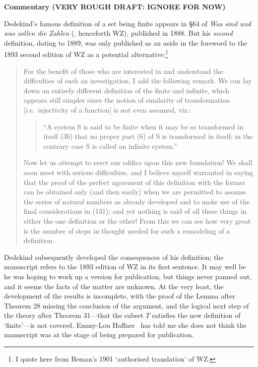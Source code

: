 \documentclass[leqno,hidelinks,10pt]{article}
\theoremstyle{definition}
\begin{document}
\newpage

\restoregeometry

\begin{center}{\Large\textbf{Commentary (VERY ROUGH DRAFT: IGNORE FOR NOW)\ \\ }}
\end{center}


\justifying



Dedekind's famous definition of a set being finite appears in \S 64 of \emph{Was sind und was sollen die Zahlen} (\cite{WZ}, henceforth WZ), published in 1888.
But his \emph{second} definition, dating to 1889, was only published as an aside in the foreword to the 1893 second edition of WZ as a potential alternative:\footnote{I quote here from Beman's 1901 `authorised translation' of WZ.}

\begin{quote}
 For the benefit of those who are interested in and understand the difficulties of such an investigation, I add the following remark. We can lay down an entirely different definition of the finite and infinite, which appears still simpler since the notion of similarity of transformation [i.e.\ injectivity of a function] is not even assumed, viz.:
 \begin{quote}
 ``A system S is said to be finite when it may be so transformed in itself (36) that no proper part (6) of S is transformed in itself; in the contrary case S is called an infinite system.''
 \end{quote}
 Now let us attempt to erect our edifice upon this new foundation!
 We shall soon meet with serious difficulties, and I believe myself warranted in saying that the proof of the perfect agreement of this definition with the former can be obtained only (and then easily) when we are permitted to assume the series of natural numbers as already developed and to make use of the final considerations in (131); and yet nothing is said of all these things in either the one definition or the other!
 From this we can see how very great is the number of steps in thought needed for such a remodeling of a definition.
\end{quote}

Dedekind subsequently developed the consequences of his definition; the manuscript %
refers to the 1893 edition of WZ in its first sentence.
It may well be he was hoping to work up a version for publication, but things never panned out, and it seems the facts of the matter are unknown.
At the very least, the development of the results is incomplete, with the proof of the Lemma after Theorem 28 missing the conclusion of the argument, and the logical next step of the theory after Theorem 31---that the subset $T$ satisfies the new definition of `finite'---is not covered.
Emmy-Lou Haffner~ has told me she does not think the manuscript was at the stage of being prepared for publication.
\end{document}
